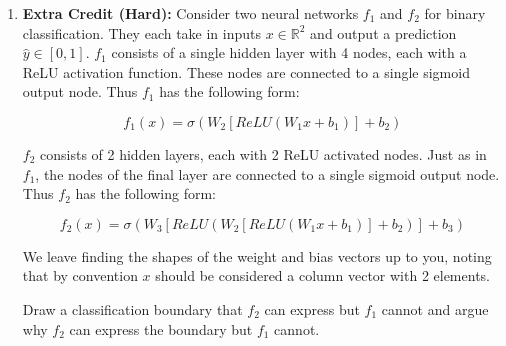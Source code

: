 \documentclass[submit]{harvardml}
\begin{document}
\begin{framed}
\begin{enumerate}
    \item \textbf{Extra Credit (Hard):} Consider two neural networks $f_1$ and $f_2$ for binary
          classification. They each take in inputs $x \in \mathbb{R}^2$ and output a
          prediction $\hat{y} \in [0,1]$. $f_1$
          consists of a single hidden layer with 4 nodes, each with
          a ReLU activation function. These nodes are connected to a single sigmoid output node. Thus
          $f_1$ has the following form:

          $$
            f_1(x) = \sigma\left( W_2[ReLU(W_1 x + b_1)] + b_2 \right)
          $$

          $f_2$ consists of 2 hidden layers, each with 2 ReLU activated nodes. Just as in $f_1$, the
          nodes of the final layer are connected to a single sigmoid output node.
          Thus $f_2$ has the following form:

          $$
            f_2(x) = \sigma(W_3[ReLU(W_2[ReLU(W_1 x + b_1)]+b_2)]+ b_3)
          $$

          We leave finding the shapes of the weight and bias vectors up to you, noting that
          by convention $x$ should be considered a column vector with 2 elements.

          Draw a classification boundary that $f_2$ can express but $f_1$ cannot and argue
          why $f_2$ can express the boundary but $f_1$ cannot.


  \end{enumerate}
\end{framed}
\end{document}
